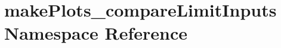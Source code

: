 \hypertarget{namespacemakePlots__compareLimitInputs}{
\section{makePlots\_\-compareLimitInputs Namespace Reference}
\label{namespacemakePlots__compareLimitInputs}
}
